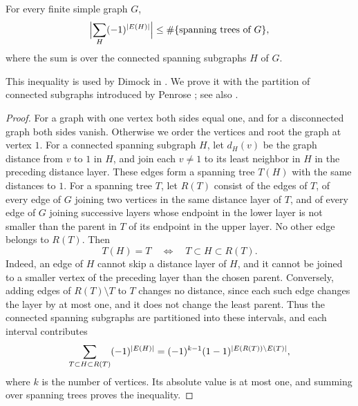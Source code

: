 \begin{lemma}\label{ch09:lem:penrose}
For every finite simple graph $G$,
\[
 \Bigl\lvert\sum_{H}(-1)^{\lvert E(H)\rvert}\Bigr\rvert\le\#\{\text{spanning trees of }G\},
\]
where the sum is over the connected spanning subgraphs $H$ of $G$.
\end{lemma}

This inequality is used by Dimock in \cite[Appendix~B, Theorem~27, p.~39, and (323), p.~42]{Dimock2013v2}. We prove it with the partition of connected subgraphs introduced by Penrose \cite{Penrose1967}; see also \cite[Section~4.1]{FernandezProcacci2007}.

\begin{proof}
For a graph with one vertex both sides equal one, and for a disconnected graph both sides vanish. Otherwise we order the vertices and root the graph at vertex $1$. For a connected spanning subgraph $H$, let $d_H(v)$ be the graph distance from $v$ to $1$ in $H$, and join each $v\ne1$ to its least neighbor in $H$ in the preceding distance layer. These edges form a spanning tree $T(H)$ with the same distances to $1$. For a spanning tree $T$, let $R(T)$ consist of the edges of $T$, of every edge of $G$ joining two vertices in the same distance layer of $T$, and of every edge of $G$ joining successive layers whose endpoint in the lower layer is not smaller than the parent in $T$ of its endpoint in the upper layer. No other edge belongs to $R(T)$. Then
\[
 T(H)=T\quad\Longleftrightarrow\quad T\subset H\subset R(T).
\]
Indeed, an edge of $H$ cannot skip a distance layer of $H$, and it cannot be joined to a smaller vertex of the preceding layer than the chosen parent. Conversely, adding edges of $R(T)\setminus T$ to $T$ changes no distance, since each such edge changes the layer by at most one, and it does not change the least parent. Thus the connected spanning subgraphs are partitioned into these intervals, and each interval contributes
\[
 \sum_{T\subset H\subset R(T)}(-1)^{\lvert E(H)\rvert}=(-1)^{k-1}(1-1)^{\lvert E(R(T))\setminus E(T)\rvert},
\]
where $k$ is the number of vertices. Its absolute value is at most one, and summing over spanning trees proves the inequality.
\end{proof}

